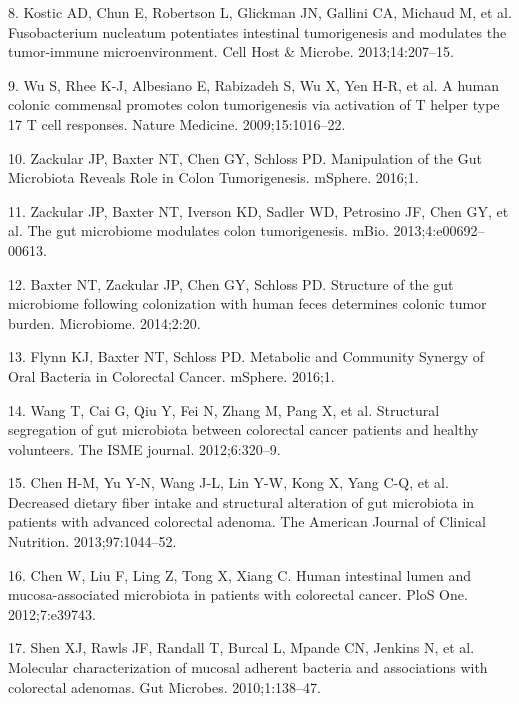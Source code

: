 \documentclass[12pt,]{article}
\begin{document}
\hypertarget{ref-kostic_fusobacterium_2013}{}
8. Kostic AD, Chun E, Robertson L, Glickman JN, Gallini CA, Michaud M,
et al. Fusobacterium nucleatum potentiates intestinal tumorigenesis and
modulates the tumor-immune microenvironment. Cell Host \& Microbe.
2013;14:207--15.

\hypertarget{ref-wu_human_2009}{}
9. Wu S, Rhee K-J, Albesiano E, Rabizadeh S, Wu X, Yen H-R, et al. A
human colonic commensal promotes colon tumorigenesis via activation of T
helper type 17 T cell responses. Nature Medicine. 2009;15:1016--22.

\hypertarget{ref-zackular_manipulation_2016}{}
10. Zackular JP, Baxter NT, Chen GY, Schloss PD. Manipulation of the Gut
Microbiota Reveals Role in Colon Tumorigenesis. mSphere. 2016;1.

\hypertarget{ref-zackular_gut_2013}{}
11. Zackular JP, Baxter NT, Iverson KD, Sadler WD, Petrosino JF, Chen
GY, et al. The gut microbiome modulates colon tumorigenesis. mBio.
2013;4:e00692--00613.

\hypertarget{ref-baxter_structure_2014}{}
12. Baxter NT, Zackular JP, Chen GY, Schloss PD. Structure of the gut
microbiome following colonization with human feces determines colonic
tumor burden. Microbiome. 2014;2:20.

\hypertarget{ref-flynn_metabolic_2016}{}
13. Flynn KJ, Baxter NT, Schloss PD. Metabolic and Community Synergy of
Oral Bacteria in Colorectal Cancer. mSphere. 2016;1.

\hypertarget{ref-wang_structural_2012}{}
14. Wang T, Cai G, Qiu Y, Fei N, Zhang M, Pang X, et al. Structural
segregation of gut microbiota between colorectal cancer patients and
healthy volunteers. The ISME journal. 2012;6:320--9.

\hypertarget{ref-chen_decreased_2013}{}
15. Chen H-M, Yu Y-N, Wang J-L, Lin Y-W, Kong X, Yang C-Q, et al.
Decreased dietary fiber intake and structural alteration of gut
microbiota in patients with advanced colorectal adenoma. The American
Journal of Clinical Nutrition. 2013;97:1044--52.

\hypertarget{ref-chen_human_2012}{}
16. Chen W, Liu F, Ling Z, Tong X, Xiang C. Human intestinal lumen and
mucosa-associated microbiota in patients with colorectal cancer. PloS
One. 2012;7:e39743.

\hypertarget{ref-shen_molecular_2010}{}
17. Shen XJ, Rawls JF, Randall T, Burcal L, Mpande CN, Jenkins N, et al.
Molecular characterization of mucosal adherent bacteria and associations
with colorectal adenomas. Gut Microbes. 2010;1:138--47.
\end{document}
